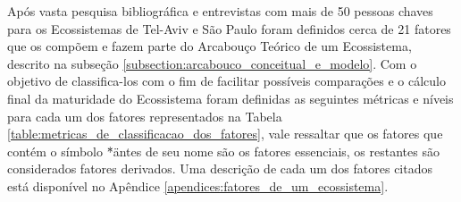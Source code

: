 Após vasta pesquisa bibliográfica e entrevistas com mais de 50 pessoas chaves para os Ecossistemas de Tel-Aviv e São Paulo foram definidos cerca de 21 fatores que os compõem e fazem parte do Arcabouço Teórico de um Ecossistema, descrito na subseção \ref{subsection:arcabouco_conceitual_e_modelo}. Com o objetivo de classifica-los com o fim de facilitar possíveis comparações e o cálculo final da maturidade do Ecossistema foram definidas as seguintes métricas e níveis para cada um dos fatores representados na Tabela \ref{table:metricas_de_classificacao_dos_fatores}, vale ressaltar que os fatores que contém o símbolo \"*\" antes de seu nome são os fatores essenciais, os restantes são considerados fatores derivados. Uma descrição de cada um dos fatores citados está disponível no Apêndice \ref{apendices:fatores_de_um_ecossistema}.

